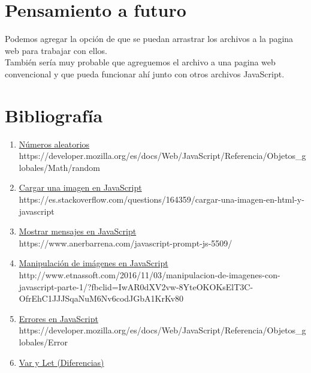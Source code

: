 \documentclass{article}
\begin{document}
\section{Pensamiento a futuro}
Podemos agregar la opción de que se puedan arrastrar los archivos a la pagina web para trabajar con ellos.\\
También sería muy probable que agreguemos el archivo a una pagina web convencional y que pueda funcionar ahí junto con otros archivos JavaScript.

\section*{Bibliografía}
\begin{enumerate}
    \item \href{https://developer.mozilla.org/es/docs/Web/JavaScript/Referencia/Objetos_globales/Math/random}{Números aleatorios}\\
    \textsf{https://developer.mozilla.org/es/docs/Web/JavaScript/Referencia/Objetos\_globales/Math/random}
    \item\href{https://es.stackoverflow.com/questions/164359/cargar-una-imagen-en-html-y-javascript}{Cargar una imagen en JavaScript}\\
    \textsf{https://es.stackoverflow.com/questions/164359/cargar-una-imagen-en-html-y-javascript}
    \item \href{https://www.anerbarrena.com/javascript-prompt-js-5509/}{Mostrar mensajes en JavaScript}\\
    \textsf{https://www.anerbarrena.com/javascript-prompt-js-5509/}
    \item \href{http://www.etnassoft.com/2016/11/03/manipulacion-de-imagenes-con-javascript-parte-1/?fbclid=IwAR0dXV2vw-8YteOKOKsElT3C-OfrEhC1JJJSqaNuM6Nv6codJGbA1KrKv80}{Manipulación de imágenes en JavaScript}\\
    \textsf{http://www.etnassoft.com/2016/11/03/manipulacion-de-imagenes-con-javascript-parte-1/?fbclid=IwAR0dXV2vw-8YteOKOKsElT3C-OfrEhC1JJJSqaNuM6Nv6codJGbA1KrKv80}
    \item \href{https://developer.mozilla.org/es/docs/Web/JavaScript/Referencia/Objetos_globales/Error}{Errores en JavaScript}\\
    \textsf{https://developer.mozilla.org/es/docs/Web/JavaScript/Referencia/Objetos\_globales/Error}
    \item \href{https://es.stackoverflow.com/questions/56116/cuando-conviene-utilizar-var-let-y-const-en-ecma-script-6}{Var y Let (Diferencias)}\\

\end{enumerate}
\end{document}
